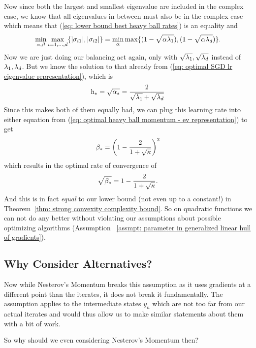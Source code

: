 Now since both the largest and smallest eigenvalue are included in the complex
case, we know that all eigenvalues in between must also be in the complex case
which means that (\ref{eq: lower bound best heavy ball rates}) is an equality
and
\begin{align*}
	\min_{\alpha,\beta}\max_{i=1,\dots,d}\{|\sigma_{i1}|,|\sigma_{i2}|\}
	= \min_{\alpha}\max\{(1-\sqrt{\alpha\lambda_1}), (1-\sqrt{\alpha\lambda_d})\}.
\end{align*}
Now we are just doing our balancing act  again, only with 
\(\sqrt{\lambda_1},\sqrt{\lambda_d}\) instead of
\(\lambda_1,\lambda_d\). But we know the solution to that already
from (\ref{eq: optimal SGD lr eigenvalue representation}),
which is
\begin{align*}
	\text{h}_* = \sqrt{\alpha_*} = \frac{2}{\sqrt{\lambda_1}+\sqrt{\lambda_d}}
\end{align*}
%
Since this makes both of them equally bad, we can plug this learning rate into
either equation from (\ref{eq: optimal heavy ball momentum - ev representation})
to get
%
\begin{align*}
	\beta_*=\left(1-\frac{2}{1+\sqrt{\kappa}}\right)^2
\end{align*}
%
which results in the optimal rate of convergence of
%
\begin{align*}
	\sqrt{\beta_*} = 1-\frac{2}{1+\sqrt{\kappa}}.
\end{align*}
%
And this is in fact \emph{equal} to our lower bound (not even up to a constant!) in
Theorem~\ref{thm: strong convexity complexity bound}. So on quadratic functions
we can not do any better without violating our assumptions about possible
optimizing algorithms (Assumption~ \ref{assmpt: parameter in generalized linear
hull of gradients}).

\subsection{Why Consider Alternatives?}

Now while Nesterov's Momentum breaks this assumption as it uses gradients at a
different point than the iterates, it does not break it fundamentally. The
assumption applies to the intermediate states \(y_n\) which are not too far
from our actual iterates and would thus allow us to make similar statements
about them with a bit of work.

So why should we even considering Nesterov's Momentum then?

